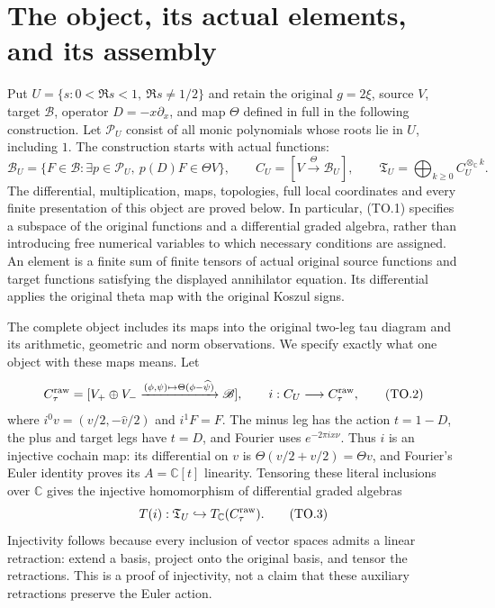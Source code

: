 \section{The object, its actual elements, and its assembly}

Put $U=\{s:0<\Re s<1,\ \Re s\ne1/2\}$ and retain the original
$g=2\xi$, source $V$, target $\mathscr B$, operator $D=-x\partial_x$,
and map $\Theta$ defined in full in the following construction.
Let $\mathcal P_U$ consist of all monic polynomials whose roots lie in
$U$, including $1$.  The construction starts with actual functions:
\[
 \mathscr B_U=\{F\in\mathscr B:\exists p\in\mathcal P_U,\
                              p(D)F\in\Theta V\},\qquad
 C_U=[V\xrightarrow\Theta\mathscr B_U],\qquad
 \mathfrak T_U=\bigoplus_{k\ge0}C_U^{\otimes_{\mathbb C}k}.
 \tag{TO.1}
\]
The differential, multiplication, maps, topologies, full local
coordinates and every finite presentation of this object are proved
below.  In particular, (TO.1) specifies a subspace of the original
functions and a differential graded algebra, rather than introducing
free numerical variables to which necessary conditions are assigned.
An element is a finite sum of finite tensors of actual original
source functions and target functions satisfying the displayed
annihilator equation.  Its differential applies the original theta
map with the original Koszul signs.

The complete object includes its maps into the original two-leg
tau diagram and its arithmetic, geometric and norm observations.
We specify exactly what one object with these maps means.  Let
\[
 C_\tau^{\rm raw}
 =[V_+\oplus V_-\xrightarrow{(\phi,\psi)\mapsto
                    \Theta(\phi-\widehat\psi)}\mathscr B],
 \qquad
 i:C_U\longrightarrow C_\tau^{\rm raw},
 \tag{TO.2}
\]
where $i^0v=(v/2,-\widehat v/2)$ and $i^1F=F$.  The minus leg has
the action $t=1-D$, the plus and target legs have $t=D$, and Fourier
uses $e^{-2\pi ix\nu}$.  Thus $i$ is an injective cochain map:
its differential on $v$ is $\Theta(v/2+v/2)=\Theta v$, and Fourier's
Euler identity proves its $A=\mathbb C[t]$ linearity.  Tensoring
these literal inclusions over $\mathbb C$ gives the injective
homomorphism of differential graded algebras
\[
 T(i):\mathfrak T_U\hookrightarrow
       T_{\mathbb C}(C_\tau^{\rm raw}).                       \tag{TO.3}
\]
Injectivity follows because every inclusion of vector spaces admits
a linear retraction: extend a basis, project onto the original basis,
and tensor the retractions.  This is a proof of injectivity, not a
claim that these auxiliary retractions preserve the Euler action.

